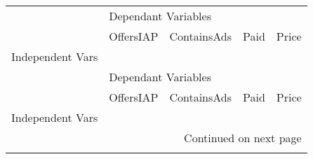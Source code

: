 \begin{longtable}[h!]{lllll}
\toprule
{} & \multicolumn{4}{l}{Dependant Variables} \\
{} &           OffersIAP & ContainsAds &       Paid &      Price \\
Independent Vars  &                     &             &            &            \\
\midrule
\endfirsthead

\toprule
{} & \multicolumn{4}{l}{Dependant Variables} \\
{} &           OffersIAP & ContainsAds &       Paid &      Price \\
Independent Vars  &                     &             &            &            \\
\midrule
\endhead
\midrule
\multicolumn{5}{r}{{Continued on next page}} \\
\midrule
\endfoot


\end{longtable}
